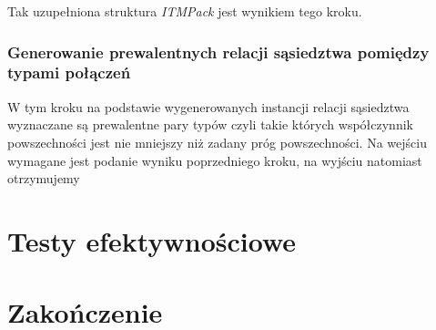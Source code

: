 \documentclass[12pt]{article}
\begin{document}
Tak uzupełniona struktura \textit{ITMPack} jest wynikiem tego kroku.


\subsubsection{Generowanie prewalentnych relacji sąsiedztwa pomiędzy typami połączeń}

W tym kroku na podstawie wygenerowanych instancji relacji sąsiedztwa wyznaczane są prewalentne pary typów czyli takie których współczynnik powszechności jest nie mniejszy niż zadany próg powszechności.
Na wejściu wymagane jest podanie wyniku poprzedniego kroku, na wyjściu natomiast otrzymujemy  


\newpage
\section{Testy efektywnościowe}
\label{sec:tests}

\section{Zakończenie}
\label{sec:fin}

\newpage
\end{document}
